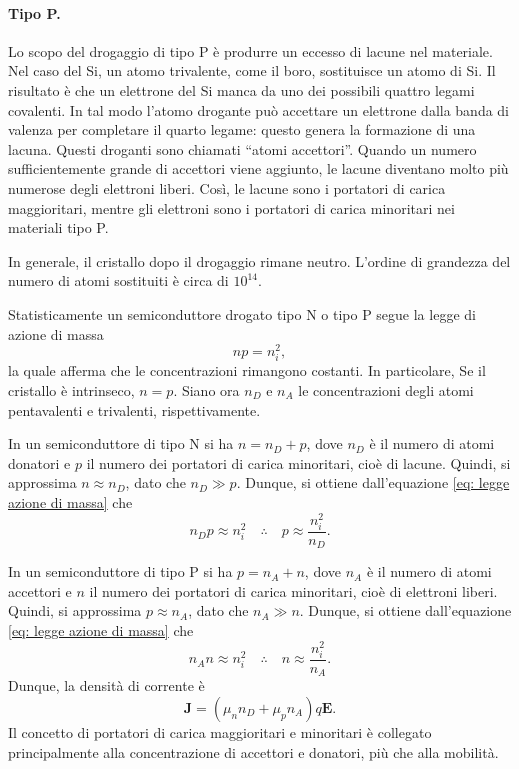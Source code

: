 \paragraph{Tipo P.}Lo scopo del drogaggio di tipo P è produrre un eccesso di lacune nel materiale. Nel caso del Si, un atomo trivalente, come il boro, sostituisce un atomo di Si. Il risultato è che un elettrone del Si manca da uno dei possibili quattro legami covalenti. In tal modo l'atomo drogante può accettare un elettrone dalla banda di valenza per completare il quarto legame: questo genera la formazione di una lacuna. Questi droganti sono chiamati ``atomi accettori''. Quando un numero sufficientemente grande di accettori viene aggiunto, le lacune diventano molto più numerose degli elettroni liberi. Così, le lacune sono i portatori di carica maggioritari, mentre gli elettroni sono i portatori di carica minoritari nei materiali tipo P. 
\begin{obs}
    In generale, il cristallo dopo il drogaggio rimane neutro. L'ordine di grandezza del numero di atomi sostituiti è circa di $10^{14}$.
\end{obs}
Statisticamente un semiconduttore drogato tipo N o tipo P segue la legge di azione di massa
\begin{equation}
    \label{eq: legge azione di massa}
    np=n_i^2,
\end{equation}
la quale afferma che le concentrazioni rimangono costanti. In particolare, Se il cristallo è intrinseco, $n=p$. Siano  ora $n_D$ e $n_A$ le concentrazioni degli atomi pentavalenti e trivalenti, rispettivamente.

In un semiconduttore di tipo N si ha $n=n_D+p$, dove $n_D$ è il numero di atomi donatori e $p$ il numero dei portatori di carica minoritari, cioè di lacune. Quindi, si approssima $n\approx n_D$, dato che $n_D\gg p$. Dunque, si ottiene dall'equazione \eqref{eq: legge azione di massa} che
\begin{equation}
    n_Dp\approx n_i^2\quad\therefore\quad p\approx\frac{n_i^2}{n_D}.
\end{equation}

In un semiconduttore di tipo P si ha $p=n_A+n$, dove $n_A$ è il numero di atomi accettori e $n$ il numero dei portatori di carica minoritari, cioè di elettroni liberi.
Quindi, si approssima $p\approx n_A$, dato che $n_A\gg n$. Dunque, si ottiene dall'equazione \eqref{eq: legge azione di massa} che
\begin{equation}
    n_An\approx n_i^2\quad\therefore\quad n\approx\frac{n_i^2}{n_A}.
\end{equation}
Dunque, la densità di corrente è
\begin{equation}
    \bm{J}=(\mu_nn_D+\mu_pn_A)q\bm{E}.
\end{equation}
Il concetto di portatori di carica maggioritari e minoritari è collegato principalmente alla concentrazione di accettori e donatori, più che alla mobilità.

